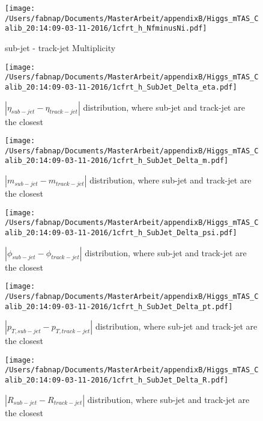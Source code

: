 \begin{figure}
 
\texttt{[image: /Users/fabnap/Documents/MasterArbeit/appendixB/Higgs\_mTAS\_Calib\_20:14:09-03-11-2016/1cfrt\_h\_NfminusNi.pdf]}
\caption{sub-jet - track-jet Multiplicity}
 
\end{figure}

\clearpage %

\begin{figure}
 
\texttt{[image: /Users/fabnap/Documents/MasterArbeit/appendixB/Higgs\_mTAS\_Calib\_20:14:09-03-11-2016/1cfrt\_h\_SubJet\_Delta\_eta.pdf]}
\caption{$| \eta_{sub-jet} - \eta_{track-jet} | $ distribution, where sub-jet and track-jet are the closest}
 
\end{figure}
 
\begin{figure}
 
\texttt{[image: /Users/fabnap/Documents/MasterArbeit/appendixB/Higgs\_mTAS\_Calib\_20:14:09-03-11-2016/1cfrt\_h\_SubJet\_Delta\_m.pdf]}
\caption{$| m_{sub-jet} - m_{track-jet} |$ distribution, where sub-jet and track-jet are the closest}
 
\end{figure}
 
\begin{figure}
 
\texttt{[image: /Users/fabnap/Documents/MasterArbeit/appendixB/Higgs\_mTAS\_Calib\_20:14:09-03-11-2016/1cfrt\_h\_SubJet\_Delta\_psi.pdf]}
\caption{$| \phi_{sub-jet} - \phi_{track-jet} | $ distribution, where sub-jet and track-jet are the closest}
 
\end{figure}
\begin{figure}
 
\texttt{[image: /Users/fabnap/Documents/MasterArbeit/appendixB/Higgs\_mTAS\_Calib\_20:14:09-03-11-2016/1cfrt\_h\_SubJet\_Delta\_pt.pdf]}
\caption{$| p_{T,sub-jet} - p_{T,track-jet} | $ distribution, where sub-jet and track-jet are the closest}
 
\end{figure}
 
\begin{figure}
 
\texttt{[image: /Users/fabnap/Documents/MasterArbeit/appendixB/Higgs\_mTAS\_Calib\_20:14:09-03-11-2016/1cfrt\_h\_SubJet\_Delta\_R.pdf]}
\caption{$| R_{sub-jet} - R_{track-jet} | $ distribution, where sub-jet and track-jet are the closest}
 
\end{figure}
 

